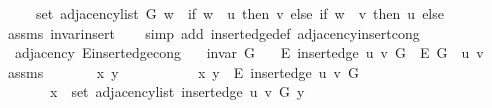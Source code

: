 \begin{isabellebody}
\ \ \ \ \ set\ {\isacharparenleft}{\kern0pt}adjacency{\isacharunderscore}{\kern0pt}list\ G\ w{\isacharparenright}{\kern0pt}\ {\isasymunion}\ {\isacharparenleft}{\kern0pt}if\ w\ {\isacharequal}{\kern0pt}\ u\ then\ {\isacharbraceleft}{\kern0pt}v{\isacharbraceright}{\kern0pt}\ else\ if\ w\ {\isacharequal}{\kern0pt}\ v\ then\ {\isacharbraceleft}{\kern0pt}u{\isacharbraceright}{\kern0pt}\ else\ {\isacharbraceleft}{\kern0pt}{\isacharbraceright}{\kern0pt}{\isacharparenright}{\kern0pt}{\isachardoublequoteclose}\isanewline
%
\isadelimproof
\ \ %
\endisadelimproof
%
\isatagproof
{}\isamarkupfalse%
\ assms\ invar{\isacharunderscore}{\kern0pt}insert{\isacharprime}{\kern0pt}\isanewline
\ \ \isamarkupfalse%
\ {\isacharparenleft}{\kern0pt}simp\ add{\isacharcolon}{\kern0pt}\ insert{\isacharunderscore}{\kern0pt}edge{\isacharunderscore}{\kern0pt}def\ adjacency{\isacharunderscore}{\kern0pt}insert{\isacharprime}{\kern0pt}{\isacharunderscore}{\kern0pt}cong{\isacharparenright}{\kern0pt}%
\endisatagproof
{\isafoldproof}%
%
\isadelimproof
\isanewline
%
\endisadelimproof
\isanewline
{}\isamarkupfalse%
\ {\isacharparenleft}{\kern0pt}\ adjacency{\isacharparenright}{\kern0pt}\ E{\isacharunderscore}{\kern0pt}insert{\isacharunderscore}{\kern0pt}edge{\isacharunderscore}{\kern0pt}cong{\isacharcolon}{\kern0pt}\isanewline
\ \ \ {\isachardoublequoteopen}invar\ G{\isachardoublequoteclose}\isanewline
\ \ \ {\isachardoublequoteopen}E\ {\isacharparenleft}{\kern0pt}insert{\isacharunderscore}{\kern0pt}edge\ u\ v\ G{\isacharparenright}{\kern0pt}\ {\isacharequal}{\kern0pt}\ E\ G\ {\isasymunion}\ {\isacharbraceleft}{\kern0pt}{\isacharbraceleft}{\kern0pt}u{\isacharcomma}{\kern0pt}\ v{\isacharbraceright}{\kern0pt}{\isacharbraceright}{\kern0pt}{\isachardoublequoteclose}\isanewline
%
\isadelimproof
\ \ %
\endisadelimproof
%
\isatagproof
{}\isamarkupfalse%
\ assms\isanewline
{}\isamarkupfalse%
\ {\isacharminus}{\kern0pt}\isanewline
\ \ \isacommand{{\isacharbraceleft}{\kern0pt}}\isamarkupfalse%
\ \isamarkupfalse%
\ x\ y\isanewline
\ \ \ \ \isamarkupfalse%
\isanewline
\ \ \ \ \ \ {\isachardoublequoteopen}{\isacharbraceleft}{\kern0pt}x{\isacharcomma}{\kern0pt}\ y{\isacharbraceright}{\kern0pt}\ {\isasymin}\ E\ {\isacharparenleft}{\kern0pt}insert{\isacharunderscore}{\kern0pt}edge\ u\ v\ G{\isacharparenright}{\kern0pt}\ {\isasymlongleftrightarrow}\isanewline
\ \ \ \ \ \ \ x\ {\isasymin}\ set\ {\isacharparenleft}{\kern0pt}adjacency{\isacharunderscore}{\kern0pt}list\ {\isacharparenleft}{\kern0pt}insert{\isacharunderscore}{\kern0pt}edge\ u\ v\ G{\isacharparenright}{\kern0pt}\ y{\isacharparenright}{\kern0pt}\ {\isasymor}\isanewline

\end{isabellebody}

